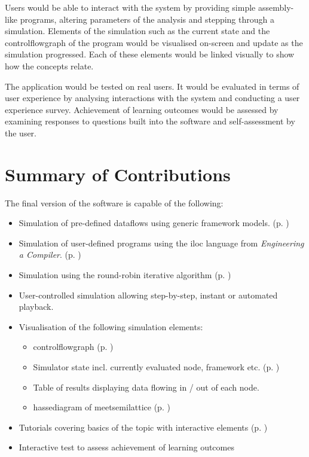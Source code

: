 \documentclass[bsc,twoside,singlespacing,parskip,logo,notimes,normalheadings]{infthesis}
\begin{document}
    Users would be able to interact with the system by providing
    simple assembly-like programs, altering parameters of the analysis
    and stepping through a simulation. Elements of the simulation such
    as the current state and the \gls{controlflowgraph} of the program
    would be visualised on-screen and update as the simulation
    progressed. Each of these elements would be linked visually to
    show how the concepts relate.
    
    The application would be tested on real users. It would be
    evaluated in terms of user experience by analysing interactions
    with the system and conducting a user experience
    survey. Achievement of learning outcomes would be assessed by
    examining responses to questions built into the software and
    self-assessment by the user.
    
    \section{Summary of Contributions}
    The final version of the software is capable of the following:
    
    \begin{itemize}
    \item Simulation of pre-defined \gls{dataflow}s using generic
      framework models. (p. )%
    \item Simulation of user-defined programs using the
      \gls{iloc}\cite[appx.~A]{eac} language from {\em Engineering a
        Compiler}. (p. )%
    \item Simulation using the round-robin iterative algorithm (p.
      ) %
    \item User-controlled simulation allowing step-by-step, instant or
      automated playback.
    \item Visualisation of the following simulation elements:
      \begin{itemize}
      \item \Gls{controlflowgraph} (p. )%
      \item Simulator state incl. currently evaluated node,
        framework etc. (p. )%
      \item Table of results displaying data flowing in / out of each
        node.
      \item \Gls{hassediagram} of \gls{meetsemilattice} (p.
        ) %
      \end{itemize}
    \item Tutorials covering basics of the topic with interactive
      elements (p. )%
    \item Interactive test to assess achievement of learning outcomes
    \end{itemize}
\end{document}
